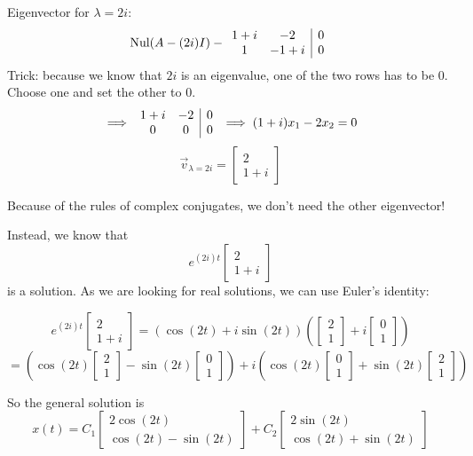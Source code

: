 \documentclass[12pt]{article}
\begin{document}
Eigenvector for $\lambda = 2i$:
\[\text{Nul}(A- (2i)I) - \begin{array}{c c | c}
    1 + i & -2 & 0\\
    1 & -1 + i & 0
\end{array}\]
Trick: because we know that $2i$ is an eigenvalue, one of the two rows has to be 0. Choose one and set the other to 0. 
\[\implies \begin{array}{c c | c}
    1 + i & -2 & 0\\
    0 & 0 & 0
\end{array} \implies (1+ i)x_1 -2x_2 = 0\]
\[\vec{v}_{\lambda = 2i} = \begin{bmatrix}
    2\\
    1 + i
\end{bmatrix}\]

Because of the rules of complex conjugates, we don't need the other eigenvector!

Instead, we know that 
\[e^{(2i) t} \begin{bmatrix}
    2\\ 1 +i
\end{bmatrix}\]
is a solution. As we are looking for real solutions, we can use Euler's identity:

\[e^{(2i) t} \begin{bmatrix}
    2\\ 1 +i
\end{bmatrix} = \left(\cos(2t) + i \sin(2t)\right)\left(\begin{bmatrix}
    2\\1
\end{bmatrix} + i \begin{bmatrix}
    0\\1
\end{bmatrix}\right)\]
\[= \left(\cos(2t) \begin{bmatrix}
    2\\1
\end{bmatrix} - \sin(2t) \begin{bmatrix}
    0\\1
\end{bmatrix}\right) + i \left(\cos (2t) \begin{bmatrix}
    0\\1
\end{bmatrix} + \sin(2t) \begin{bmatrix}
    2\\1
\end{bmatrix}\right)\]

So the general solution is 
\[\boxed{x(t) = C_1 \begin{bmatrix}
    2\cos (2t)\\
    \cos(2t) - \sin (2t)
\end{bmatrix} + C_2 \begin{bmatrix}
    2 \sin (2t)\\
    \cos(2t) + \sin(2t)
\end{bmatrix}}\]
\end{document}
